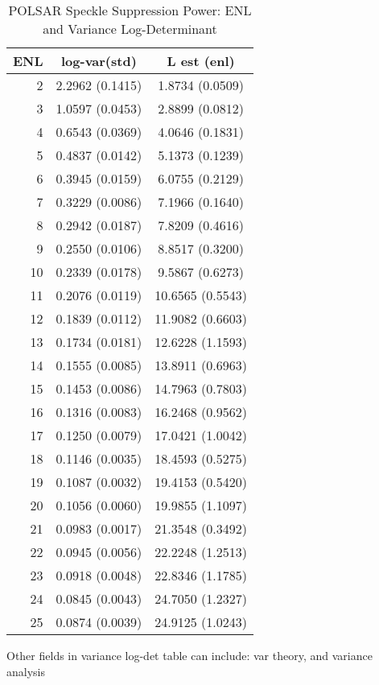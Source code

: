 \begin{table}[h!]
\centering
\begin{tabular}{r|c|c}
 ENL & log-var(std)    & L est (enl)      \\
\hline
   2 & 2.2962 (0.1415) & 1.8734 (0.0509)  \\
   3 & 1.0597 (0.0453) & 2.8899 (0.0812)  \\
   4 & 0.6543 (0.0369) & 4.0646 (0.1831)  \\
   5 & 0.4837 (0.0142) & 5.1373 (0.1239)  \\
   6 & 0.3945 (0.0159) & 6.0755 (0.2129)  \\
   7 & 0.3229 (0.0086) & 7.1966 (0.1640)  \\
   8 & 0.2942 (0.0187) & 7.8209 (0.4616)  \\
   9 & 0.2550 (0.0106) & 8.8517 (0.3200)  \\
  10 & 0.2339 (0.0178) & 9.5867 (0.6273)  \\
  11 & 0.2076 (0.0119) & 10.6565 (0.5543) \\
  12 & 0.1839 (0.0112) & 11.9082 (0.6603) \\
  13 & 0.1734 (0.0181) & 12.6228 (1.1593) \\
  14 & 0.1555 (0.0085) & 13.8911 (0.6963) \\
  15 & 0.1453 (0.0086) & 14.7963 (0.7803) \\
  16 & 0.1316 (0.0083) & 16.2468 (0.9562) \\
  17 & 0.1250 (0.0079) & 17.0421 (1.0042) \\
  18 & 0.1146 (0.0035) & 18.4593 (0.5275) \\
  19 & 0.1087 (0.0032) & 19.4153 (0.5420) \\
  20 & 0.1056 (0.0060) & 19.9855 (1.1097) \\
  21 & 0.0983 (0.0017) & 21.3548 (0.3492) \\
  22 & 0.0945 (0.0056) & 22.2248 (1.2513) \\
  23 & 0.0918 (0.0048) & 22.8346 (1.1785) \\
  24 & 0.0845 (0.0043) & 24.7050 (1.2327) \\
  25 & 0.0874 (0.0039) & 24.9125 (1.0243) \\
\end{tabular}
\caption{ POLSAR Speckle Suppression Power: ENL and Variance Log-Determinant }
\label{tab:enl_in_log_domain}
\end{table}

Other fields in variance log-det table can include: var theory, and variance analysis

